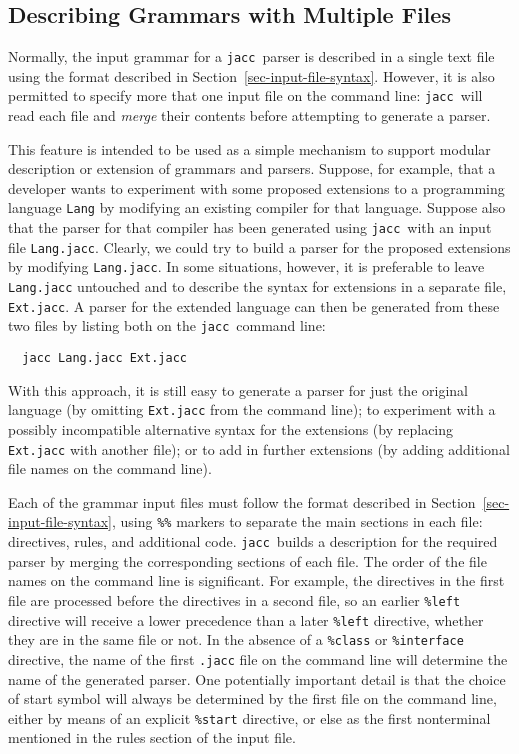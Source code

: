 \documentclass[12pt]{article}
\def\jacc{{\tt jacc}}
\begin{document}
\subsection{Describing Grammars with Multiple Files}\label{sec-multiple}
Normally, the input grammar for a \jacc\ parser is described in a
single text file 
using the format described in Section~\ref{sec-input-file-syntax}.
However, it is also permitted to specify more that one input
file on the command line: \jacc\ will read each
file and {\em merge}\/ their contents
before attempting to generate a parser.

This feature is intended to be used as a simple mechanism to
support modular description or extension of grammars and parsers.
Suppose, for example, that a developer wants to experiment with
some proposed extensions to a programming language \verb"Lang"
by modifying an existing compiler for that language.  Suppose
also that the parser for that compiler has been generated using
\jacc\ with an input file \verb"Lang.jacc".  Clearly, we could try
to build a parser for the proposed extensions
by modifying \verb"Lang.jacc".  In some situations, however, it
is preferable to leave \verb"Lang.jacc" untouched and to describe
the syntax for extensions in a separate file, \verb"Ext.jacc".
A parser for the extended language can then be generated from
these two files by listing both on the \jacc\ command line:
{\small
\begin{verbatim}
  jacc Lang.jacc Ext.jacc
\end{verbatim}
}%
With this approach, it is still easy to generate a parser for
just the original language (by omitting \verb"Ext.jacc" from
the command line); to experiment with a possibly incompatible
alternative syntax for the extensions (by replacing \verb"Ext.jacc"
with another file); or to add in further extensions (by adding
additional file names on the command line).

Each of the grammar input files must follow the format described
in Section~\ref{sec-input-file-syntax}, using \verb"%%" markers
to separate the main sections in each file: directives, rules,
and additional code.  \jacc\ builds a description for the required
parser by merging the corresponding sections of each file.
The order of the file names on the command line is significant.
For example, the directives in the first file are processed before
the directives in a second file, so an earlier \verb"%left" directive
will receive a lower precedence than a later \verb"%left" directive,
whether they are in the same file or not.  In the absence of a
\verb"%class" or \verb"%interface" directive, the name of the first
\verb".jacc" file on the command line will determine the name of the
generated parser.  One potentially important detail is that the choice
of start symbol will always be determined by the first file on the
command line, either by means of an explicit \verb"%start" directive,
or else as the first nonterminal mentioned in the rules section of
the input file.
\end{document}
